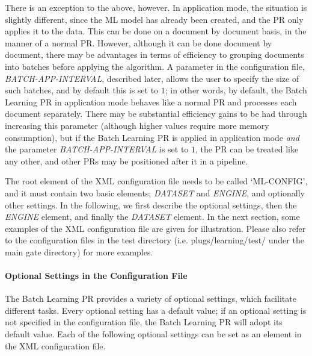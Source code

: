 There is an exception to the above, however. In application mode, the situation
is slightly different, since the ML model has already been created, and the PR
only applies it to the data. This can be done on a document by document basis, in
the manner of a normal PR. However, although it can be done document by document,
there may be advantages in terms of efficiency to grouping documents into batches
before applying the algorithm. A parameter in the configuration file, {\em
BATCH-APP-INTERVAL}, described later, allows the user to specify the size of such
batches, and by default this is set to $1$; in other words, by default, the Batch
Learning PR in application mode behaves like a normal PR and processes each
document separately. There may be substantial efficiency gains to be had through
increasing this parameter (although higher values require more memory
consumption), but if the Batch Learning PR is applied in application mode
\textit{and} the parameter {\em BATCH-APP-INTERVAL} is set to $1$, the PR can be
treated like any other, and other PRs may be positioned after it in a pipeline.


The root element of the XML configuration file needs to be called `ML-CONFIG',
and it must contain two basic elements; {\em DATASET} and {\em ENGINE}, and
optionally other settings. In the following, we first describe the optional
settings, then the {\em ENGINE} element, and finally the {\em DATASET} element.
In the next section, some examples of the XML configuration file are given for
illustration. Please also refer to the configuration files in the test directory
(i.e. plugs/learning/test/ under the main gate directory) for more examples.

\paragraph{Optional Settings in the Configuration File}

The Batch Learning PR provides a variety of optional settings, which facilitate
different tasks. Every optional setting has a default value; if an optional
setting is not specified in the configuration file, the Batch Learning PR will
adopt its default value. Each of the following optional settings can be set as an
element in the XML configuration file.

